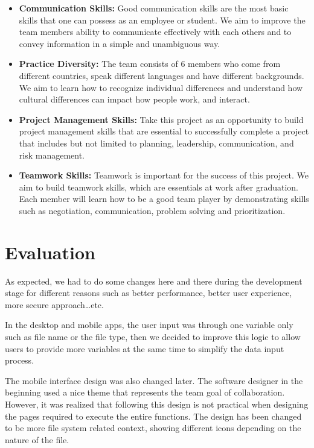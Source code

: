 \documentclass{article}
\begin{document}
\begin{itemize}
\item \textbf{Communication Skills:} Good communication skills are the most basic skills that one can possess as an employee or student. We aim to improve the team members ability to communicate effectively with each others and to convey information in a simple and unambiguous way.
\item \textbf{Practice Diversity:} The team consists of 6 members who come from different countries, speak different languages and have different backgrounds. We aim to learn how to recognize individual differences and understand how cultural differences can impact how people work, and interact.
\item \textbf{Project Management Skills:} Take this project as an opportunity to build project management skills that are essential to successfully complete a project that includes but not limited to planning, leadership, communication, and risk management.
\item \textbf{Teamwork Skills:} Teamwork is important for the success of this project. We aim to build teamwork skills, which are essentials at work after graduation. Each member will learn how to be a good team player by demonstrating skills such as negotiation, communication, problem solving and prioritization.
\end{itemize}

\section{Evaluation}
As expected, we had to do some changes here and there during the development stage for different reasons such as better performance, better user experience, more secure approach…etc.

In the desktop and mobile apps, the user input was through one variable only such as file name or the file type, then we decided to improve this logic to allow users to provide more variables at the same time to simplify the data input process.

The mobile interface design was also changed later. The software designer in the beginning used a nice theme that represents the team goal of collaboration. However, it was realized that following this design is not practical when designing the pages required to execute the entire functions. The design has been changed to be more file system related context, showing different icons depending on the nature of the file.
\end{document}
